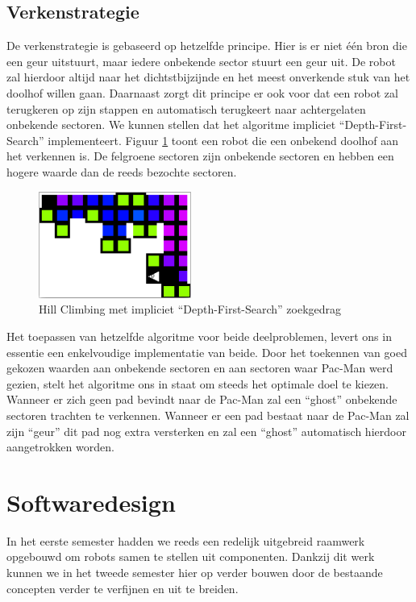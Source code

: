 \documentclass[12pt,a4paper]{report}
\begin{document}
\section{Verkenstrategie}

De verkenstrategie is gebaseerd op hetzelfde principe. Hier is er niet \'e\'en bron die een geur uitstuurt, maar iedere onbekende sector stuurt een geur uit. De robot zal hierdoor altijd naar het dichtstbijzijnde en het meest onverkende stuk van het doolhof willen gaan. Daarnaast zorgt dit principe er ook voor dat een robot zal terugkeren op zijn stappen en automatisch terugkeert naar achtergelaten onbekende sectoren. We kunnen stellen dat het algoritme impliciet ``Depth-First-Search'' implementeert. Figuur \ref{fig:dfs} toont een robot die een onbekend doolhof aan het verkennen is. De felgroene sectoren zijn onbekende sectoren en hebben een hogere waarde dan de reeds bezochte sectoren.

\begin{figure}[htbp]
  \centering
  \includegraphics[width=50mm]{resources/dfs.png}
  \caption{Hill Climbing met impliciet ``Depth-First-Search'' zoekgedrag}
  \label{fig:dfs}
\end{figure}

Het toepassen van hetzelfde algoritme voor beide deelproblemen, levert ons in essentie een enkelvoudige implementatie van beide. Door het toekennen van goed gekozen waarden aan onbekende sectoren en aan sectoren waar Pac-Man werd gezien, stelt het algoritme ons in staat om steeds het optimale doel te kiezen. Wanneer er zich geen pad bevindt naar de Pac-Man zal een ``ghost'' onbekende sectoren trachten te verkennen. Wanneer er een pad bestaat naar de Pac-Man zal zijn ``geur'' dit pad nog extra versterken en zal een ``ghost'' automatisch hierdoor aangetrokken worden.

\chapter{Softwaredesign}

In het eerste semester hadden we reeds een redelijk uitgebreid raamwerk opgebouwd om robots samen te stellen uit componenten. Dankzij dit werk kunnen we in het tweede semester hier op verder bouwen door de bestaande concepten verder te verfijnen en uit te breiden.
\end{document}
